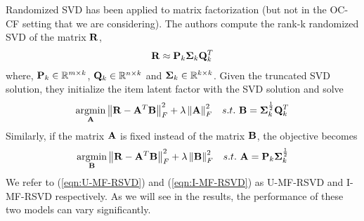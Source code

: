 Randomized SVD has been applied to matrix factorization \citep{Tang:2013}
(but not in the OC-CF setting that we are considering).
The authors compute the rank-k randomized SVD of the matrix $\R$,
\begin{align}
	\label{eqn:truncatedSVD}
	\R \approx \P_k \Sig_k \Q^T_k
\end{align}
where, $\P_k \in \mathbb{R}^{m \times k}$, $\Q_k \in \mathbb{R}^{n \times k}$ and $\Sig_k \in \mathbb{R}^{k \times k}$. Given the truncated SVD solution, they initialize the item latent factor with the SVD solution and solve
\begin{align} \label{eqn:I-MF-RSVD}
\underset{\A}{\mathrm{argmin}} & \left \| \R - \A^T\B\right \|_F^2 + \lambda \left \|  \A \right \|_F^2 & s.t.\  \B = \Sig_k^{\frac{1}{2}} \Q^T_k
\end{align}
Similarly, if the matrix $\A$ is fixed instead of the matrix $\B$, the objective becomes
\begin{align}
\label{eqn:U-MF-RSVD}
\underset{\B}{\mathrm{argmin}} & \left \| \R - \A^T\B\right \|_F^2 + \lambda \left \|  \B \right \|_F^2 & s.t.\  \A = \P_k \Sig_k^{\frac{1}{2}}
\end{align}
We refer to (\ref{eqn:U-MF-RSVD}) and (\ref{eqn:I-MF-RSVD}) as U-MF-RSVD and I-MF-RSVD respectively. As we will see in the results, the performance of these two models can vary significantly.
